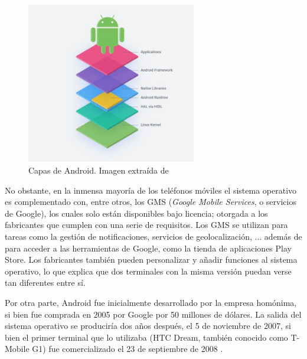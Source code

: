         \begin{figure}[h]
            \centering
            \includegraphics[width=0.66\textwidth]{figures/Android capas.jpg}
            \caption[Capas de Android.]
            {Capas de Android. Imagen extraída de \cite{perez_aosp_2019}}
            \label{figure:android:capas}
        \end{figure}

        No obstante, en la inmensa mayoría de los teléfonos móviles el sistema operativo es complementado con,
        entre otros, los GMS (\textit{Google Mobile Services}, o servicios de Google), los cuales solo están 
        disponibles bajo licencia; otorgada a los fabricantes que cumplen con una serie de requisitos. Los GMS 
        se utilizan para tareas como la gestión de notificaciones, servicios de geolocalización, ... además de para 
        acceder a las herramientas de Google, como la tienda de aplicaciones Play Store. Los fabricantes también 
        pueden personalizar y añadir funciones al sistema operativo, lo que explica que dos terminales con la misma 
        versión puedan verse tan diferentes entre sí. 
        

        Por otra parte, Android fue inicialmente desarrollado por la empresa homónima, si bien fue comprada en 2005
        por Google por 50 millones de dólares. La salida del sistema operativo se produciría dos años después, el 5 
        de noviembre de 2007, si bien el primer terminal que lo utilizaba (HTC Dream, también conocido como 
        T-Mobile G1) fue comercializado el 23 de septiembre de 2008 \cite{adeva_android_2023} \cite{marquez_asi_2022}.

